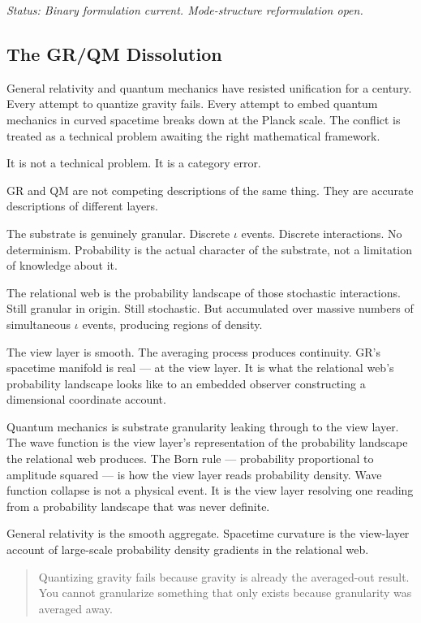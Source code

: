\documentclass[11pt,letterpaper]{article}
\begin{document}
\emph{Status: Binary formulation current. Mode-structure reformulation open.}

\subsection{The GR/QM Dissolution}
\label{sec:org6c32755}

General relativity and quantum mechanics have resisted unification for a century. Every attempt to quantize gravity fails. Every attempt to embed quantum mechanics in curved spacetime breaks down at the Planck scale. The conflict is treated as a technical problem awaiting the right mathematical framework.

It is not a technical problem. It is a category error.

GR and QM are not competing descriptions of the same thing. They are accurate descriptions of different layers.

The substrate is genuinely granular. Discrete \(\iota\) events. Discrete interactions. No determinism. Probability is the actual character of the substrate, not a limitation of knowledge about it.

The relational web is the probability landscape of those stochastic interactions. Still granular in origin. Still stochastic. But accumulated over massive numbers of simultaneous \(\iota\) events, producing regions of density.

The view layer is smooth. The averaging process produces continuity. GR's spacetime manifold is real --- at the view layer. It is what the relational web's probability landscape looks like to an embedded observer constructing a dimensional coordinate account.

Quantum mechanics is substrate granularity leaking through to the view layer. The wave function is the view layer's representation of the probability landscape the relational web produces. The Born rule --- probability proportional to amplitude squared --- is how the view layer reads probability density. Wave function collapse is not a physical event. It is the view layer resolving one reading from a probability landscape that was never definite.

General relativity is the smooth aggregate. Spacetime curvature is the view-layer account of large-scale probability density gradients in the relational web.

\begin{quote}
Quantizing gravity fails because gravity is already the averaged-out result. You cannot granularize something that only exists because granularity was averaged away.
\end{quote}
\end{document}
